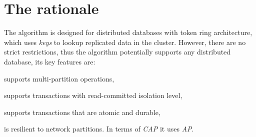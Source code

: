 
\section{The rationale}
The \mpt algorithm is designed for distributed databases with token ring architecture,
which uses \emph{keys} to lookup replicated data in the cluster. However, there are no strict restrictions, thus the algorithm potentially supports any distributed database, its key features are: \begin{enumerate*}
\item supports multi-partition operations,
\item supports transactions with read-committed isolation level,
\item supports transactions that are atomic and durable,
\item is resilient to network partitions. In terms of \emph{CAP} \cite{Brewer:2012ba} it uses \emph{AP}.
\end{enumerate*}






